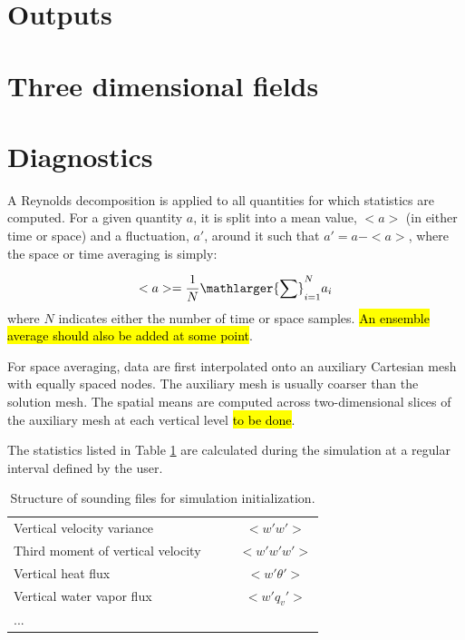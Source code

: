 \documentclass{report}
\begin{document}
\section{Outputs}
\section{Three dimensional fields}


\section{Diagnostics}

A Reynolds decomposition is applied to all quantities for which statistics are computed. For a given quantity $a$, it is split into a mean value, $<a>$  (in either time or space) and a fluctuation, $a'$, around it such that $a' = a - <a>$, where the space or time averaging is simply:

\begin{equation}
    <a> = \frac{1}{N}\mathlarger{\sum}_{i=1}^N a_i
\end{equation}
where $N$ indicates either the number of time or space samples. \hl{An ensemble average should also be added at some point}.

For space averaging, data are first interpolated onto an auxiliary Cartesian mesh with equally spaced nodes. The auxiliary mesh is usually coarser than the solution mesh.
The spatial means are computed across two-dimensional slices of the auxiliary mesh at each vertical level  \hl{to be done}.

The statistics listed in Table \ref{tab:stats} are calculated during the simulation at a regular interval defined by the user. 

\begin{table}[t]
\centering
{\footnotesize
\caption[short]{Structure of sounding files for simulation initialization.}
\label{tab:stats}
\begin{tabular*}{\textwidth}{ @{\extracolsep{\fill}} lccc}
\hline
\hline
Vertical velocity variance & & &$<w' w'>$\\
Third moment of vertical velocity & & &$<w'w'w'>$\\
Vertical heat flux & & &$<w' \theta'>$\\
Vertical water vapor flux & & &$<w' q_v'>$\\
...\\
\hline
\hline
\end{tabular*}
}
\end{table}
\end{document}
